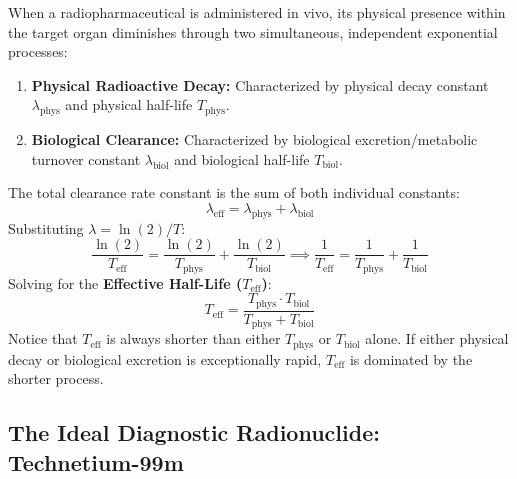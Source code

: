 \documentclass[11pt,a4paper]{article}
\begin{document}
When a radiopharmaceutical is administered in vivo, its physical presence within the target organ diminishes through two simultaneous, independent exponential processes:
\begin{enumerate}[leftmargin=*]
    \item \textbf{Physical Radioactive Decay:} Characterized by physical decay constant $\lambda_{\text{phys}}$ and physical half-life $T_{\text{phys}}$.
    \item \textbf{Biological Clearance:} Characterized by biological excretion/metabolic turnover constant $\lambda_{\text{biol}}$ and biological half-life $T_{\text{biol}}$.
\end{enumerate}
The total clearance rate constant is the sum of both individual constants:
\begin{equation}
    \lambda_{\text{eff}} = \lambda_{\text{phys}} + \lambda_{\text{biol}}
\end{equation}
Substituting $\lambda = \ln(2) / T$:
\begin{equation}
    \frac{\ln(2)}{T_{\text{eff}}} = \frac{\ln(2)}{T_{\text{phys}}} + \frac{\ln(2)}{T_{\text{biol}}} \implies \frac{1}{T_{\text{eff}}} = \frac{1}{T_{\text{phys}}} + \frac{1}{T_{\text{biol}}}
\end{equation}
Solving for the \textbf{Effective Half-Life ($T_{\text{eff}}$)}:
\begin{equation}
    T_{\text{eff}} = \frac{T_{\text{phys}} \cdot T_{\text{biol}}}{T_{\text{phys}} + T_{\text{biol}}}
\end{equation}
Notice that $T_{\text{eff}}$ is always shorter than either $T_{\text{phys}}$ or $T_{\text{biol}}$ alone. If either physical decay or biological excretion is exceptionally rapid, $T_{\text{eff}}$ is dominated by the shorter process.

\subsection{The Ideal Diagnostic Radionuclide: Technetium-99m}
\end{document}

